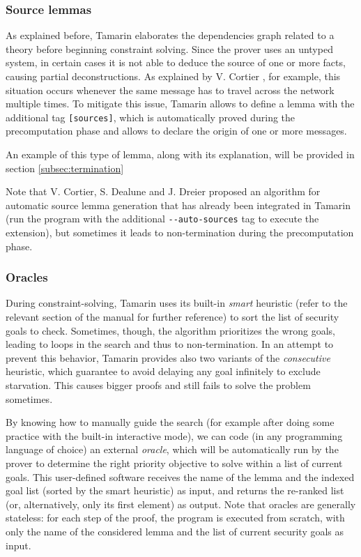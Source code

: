\documentclass[fleqn,10pt]{SelfArx} %
\begin{document}
\subsubsection{Source lemmas}

As explained before, Tamarin elaborates the dependencies graph related to a theory before beginning constraint solving. Since the prover uses an untyped system, in certain cases it is not able to deduce the source of one or more facts, causing partial deconstructions. As explained by V. Cortier \cite{autosources}, for example, this situation occurs whenever the same message has to travel across the network multiple times. To mitigate this issue, Tamarin allows to define a lemma with the additional tag \lstinline|[sources]|, which is automatically proved during the precomputation phase and allows to declare the origin of one or more messages.

An example of this type of lemma, along with its explanation, will be provided in section \ref{subsec:termination}

Note that V. Cortier, S. Dealune and J. Dreier proposed an algorithm for automatic source lemma generation \cite{autosources} that has already been integrated in Tamarin (run the program with the additional \lstinline|--auto-sources| tag to execute the extension), but sometimes it leads to non-termination during the precomputation phase.

\subsubsection{Oracles}

During constraint-solving, Tamarin uses its built-in \textit{smart} heuristic (refer to the relevant section of the manual \cite{tamarinManual} for further reference) to sort the list of security goals to check. Sometimes, though, the algorithm prioritizes the wrong goals, leading to loops in the search and thus to non-termination. In an attempt to prevent this behavior, Tamarin provides also two variants of the \textit{consecutive} heuristic, which guarantee to avoid delaying any goal infinitely to exclude starvation. This causes bigger proofs and still fails to solve the problem sometimes.

By knowing how to manually guide the search (for example after doing some practice with the built-in interactive mode), we can code (in any programming language of choice) an external \textit{oracle}, which will be automatically run by the prover to determine the right priority objective to solve within a list of current goals. This user-defined software receives the name of the lemma and the indexed goal list (sorted by the smart heuristic) as input, and returns the re-ranked list (or, alternatively, only its first element) as output. Note that oracles are generally stateless: for each step of the proof, the program is executed from scratch, with only the name of the considered lemma and the list of current security goals as input.
\end{document}
